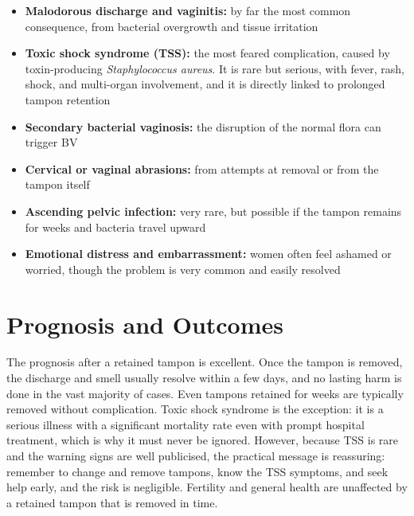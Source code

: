 \begin{itemize}
    \item \textbf{Malodorous discharge and vaginitis:} by far the most common consequence, from bacterial overgrowth and tissue irritation
    \item \textbf{Toxic shock syndrome (TSS):} the most feared complication, caused by toxin-producing \textit{Staphylococcus aureus}. It is rare but serious, with fever, rash, shock, and multi-organ involvement, and it is directly linked to prolonged tampon retention
    \item \textbf{Secondary bacterial vaginosis:} the disruption of the normal flora can trigger BV
    \item \textbf{Cervical or vaginal abrasions:} from attempts at removal or from the tampon itself
    \item \textbf{Ascending pelvic infection:} very rare, but possible if the tampon remains for weeks and bacteria travel upward
    \item \textbf{Emotional distress and embarrassment:} women often feel ashamed or worried, though the problem is very common and easily resolved
\end{itemize}

\section*{Prognosis and Outcomes}
The prognosis after a retained tampon is excellent. Once the tampon is removed, the discharge and smell usually resolve within a few days, and no lasting harm is done in the vast majority of cases. Even tampons retained for weeks are typically removed without complication. Toxic shock syndrome is the exception: it is a serious illness with a significant mortality rate even with prompt hospital treatment, which is why it must never be ignored. However, because TSS is rare and the warning signs are well publicised, the practical message is reassuring: remember to change and remove tampons, know the TSS symptoms, and seek help early, and the risk is negligible. Fertility and general health are unaffected by a retained tampon that is removed in time.

